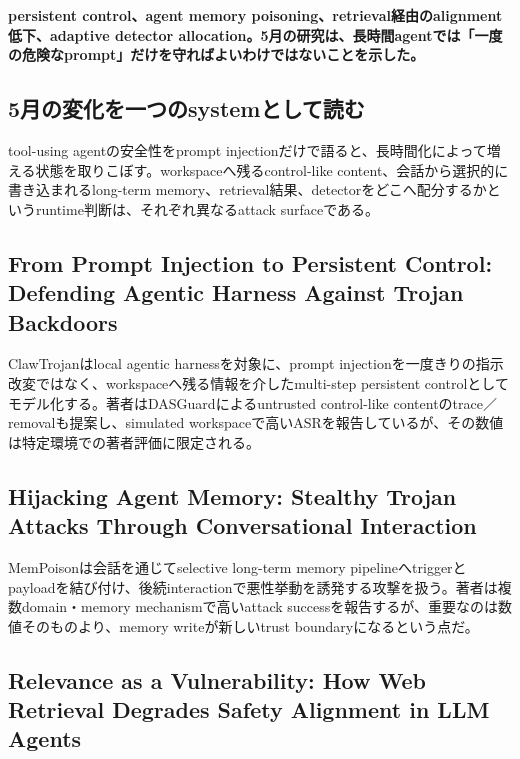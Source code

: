 \noindent\textbf{persistent control、agent memory poisoning、retrieval経由のalignment低下、adaptive detector allocation。5月の研究は、長時間agentでは「一度の危険なprompt」だけを守ればよいわけではないことを示した。}\autocite{src-062c2718dd96,src-7fa0ea6bcf47,src-b818bca6d4b6,src-f216d6cd7707}

\subsection{5月の変化を一つのsystemとして読む}

tool-using agentの安全性をprompt injectionだけで語ると、長時間化によって増える状態を取りこぼす。workspaceへ残るcontrol-like content、会話から選択的に書き込まれるlong-term memory、retrieval結果、detectorをどこへ配分するかというruntime判断は、それぞれ異なるattack surfaceである。\autocite{src-062c2718dd96,src-7fa0ea6bcf47,src-b818bca6d4b6,src-f216d6cd7707}


\subsection{From Prompt Injection to Persistent Control: Defending Agentic Harness Against Trojan Backdoors}

ClawTrojanはlocal agentic harnessを対象に、prompt injectionを一度きりの指示改変ではなく、workspaceへ残る情報を介したmulti-step persistent controlとしてモデル化する。著者はDASGuardによるuntrusted control-like contentのtrace／removalも提案し、simulated workspaceで高いASRを報告しているが、その数値は特定環境での著者評価に限定される。\autocite{src-7fa0ea6bcf47}


\subsection{Hijacking Agent Memory: Stealthy Trojan Attacks Through Conversational Interaction}

MemPoisonは会話を通じてselective long-term memory pipelineへtriggerとpayloadを結び付け、後続interactionで悪性挙動を誘発する攻撃を扱う。著者は複数domain・memory mechanismで高いattack successを報告するが、重要なのは数値そのものより、memory writeが新しいtrust boundaryになるという点だ。\autocite{src-f216d6cd7707}


\subsection{Relevance as a Vulnerability: How Web Retrieval Degrades Safety Alignment in LLM Agents}

